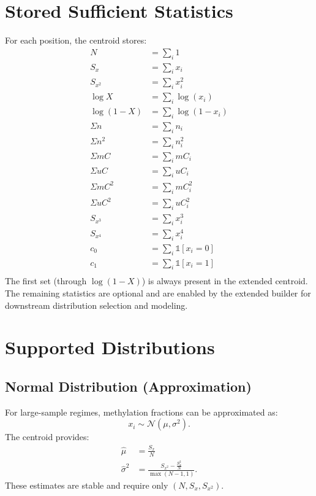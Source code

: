 \documentclass[11pt]{article}
\begin{document}
\section{Stored Sufficient Statistics}
For each position, the centroid stores:
\begin{align*}
  N &= \sum_i 1 \\
  S_x &= \sum_i x_i \\
  S_{x^2} &= \sum_i x_i^2 \\
  \log X &= \sum_i \log(x_i) \\
  \log (1-X) &= \sum_i \log(1-x_i) \\
  \Sigma n &= \sum_i n_i \\
  \Sigma n^2 &= \sum_i n_i^2 \\
  \Sigma mC &= \sum_i mC_i \\
  \Sigma uC &= \sum_i uC_i \\
  \Sigma mC^2 &= \sum_i mC_i^2 \\
  \Sigma uC^2 &= \sum_i uC_i^2 \\
  S_{x^3} &= \sum_i x_i^3 \\
  S_{x^4} &= \sum_i x_i^4 \\
  c_0 &= \sum_i \mathbb{1}[x_i = 0] \\
  c_1 &= \sum_i \mathbb{1}[x_i = 1] \\
\end{align*}
The first set (through $\log(1-X)$) is always present in the extended centroid.
The remaining statistics are optional and are enabled by the extended builder
for downstream distribution selection and modeling.

\section{Supported Distributions}

\subsection{Normal Distribution (Approximation)}
For large-sample regimes, methylation fractions can be approximated as:
\[
  x_i \sim \mathcal{N}(\mu, \sigma^2)
.\]
The centroid provides:
\begin{align*}
  \hat{\mu} &= \frac{S_x}{N} \\
  \hat{\sigma}^2 &= \frac{S_{x^2} - \frac{S_x^2}{N}}{\max(N-1, 1)}
.\end{align*}
These estimates are stable and require only $(N, S_x, S_{x^2})$.
\end{document}
